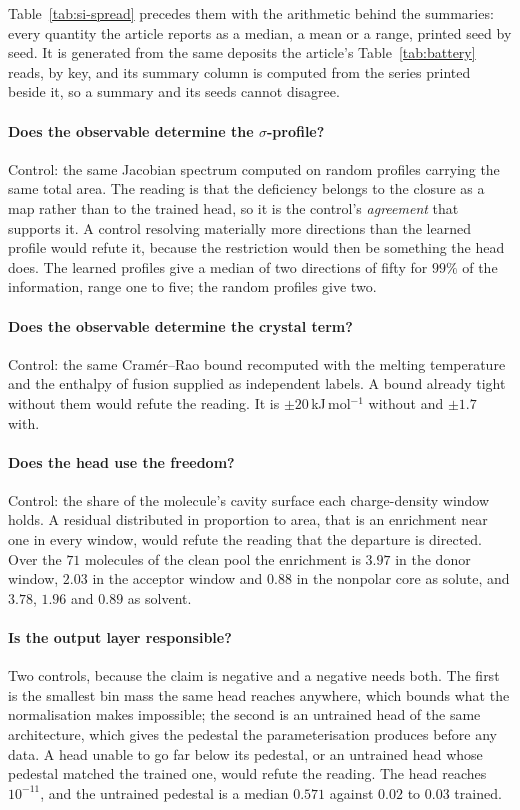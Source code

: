Table~\ref{tab:si-spread} precedes them with the arithmetic behind the summaries: every quantity
the article reports as a median, a mean or a range, printed seed by seed. It is generated from the
same deposits the article's Table~\ref{tab:battery} reads, by key, and its summary column is
computed from the series printed beside it, so a summary and its seeds cannot disagree.



\paragraph{Does the observable determine the $\sigma$-profile?}
Control: the same Jacobian spectrum computed on random profiles carrying the same total area. The
reading is that the deficiency belongs to the closure as a map rather than to the trained head, so
it is the control's \emph{agreement} that supports it. A control resolving materially more
directions than the learned profile would refute it, because the restriction would then be
something the head does. The learned profiles give a median of two directions of fifty for $99\%$
of the information, range one to five; the random profiles give two.

\paragraph{Does the observable determine the crystal term?}
Control: the same Cram\'er--Rao bound recomputed with the melting temperature and the enthalpy of
fusion supplied as independent labels. A bound already tight without them would refute the reading.
It is $\pm20$\,kJ\,mol$^{-1}$ without and $\pm1.7$ with.

\paragraph{Does the head use the freedom?}
Control: the share of the molecule's cavity surface each charge-density window holds. A residual
distributed in proportion to area, that is an enrichment near one in every window, would refute the
reading that the departure is directed. Over the $71$ molecules of the clean pool the enrichment is
$3.97$ in the donor window, $2.03$ in the acceptor window and $0.88$ in the nonpolar core as
solute, and $3.78$, $1.96$ and $0.89$ as solvent.

\paragraph{Is the output layer responsible?}
Two controls, because the claim is negative and a negative needs both. The first is the smallest
bin mass the same head reaches anywhere, which bounds what the normalisation makes impossible; the
second is an untrained head of the same architecture, which gives the pedestal the parameterisation
produces before any data. A head unable to go far below its pedestal, or an untrained head whose
pedestal matched the trained one, would refute the reading. The head reaches $10^{-11}$, and the
untrained pedestal is a median $0.571$ against $0.02$ to $0.03$ trained.

